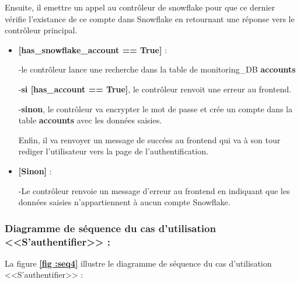     \par Ensuite, il emettre un appel au contrôleur de snowflake pour que ce dernier vérifie l'existance de ce compte dans Snowflake en retournant une réponse vers le contrôleur principal. 
    \begin{itemize}
        \item \textbf{[has\_snowflake\_account == True]} :
       \par -le contrôleur lance une recherche dans la table de monitoring\_DB \textbf{accounts}
       \par -\textbf{si [has\_account == True]}, le contrôleur renvoit une erreur au frontend.
       \par -\textbf{sinon}, le contrôleur va encrypter le mot de passe et crée un compte dans la table \textbf{accounts} avec les données saisies.
       \par Enfin, il va renvoyer un message de succéss au frontend qui va à son tour rediger l'utilisateur vers la page de l'authentification. 
       \item \textbf{[Sinon]} : 
       \par -Le contrôleur renvoie un message d'erreur au frontend en indiquant que les données saisies n'appartiennent à aucun compte Snowflake.
    \end{itemize}
    \subsubsection{Diagramme de séquence du cas d'utilisation <<S'authentifier>> :}
    \par La figure \textbf{\ref*{fig :seq4}} illustre le diagramme de séquence du cas d'utilisation <<S'authentifier>> :

